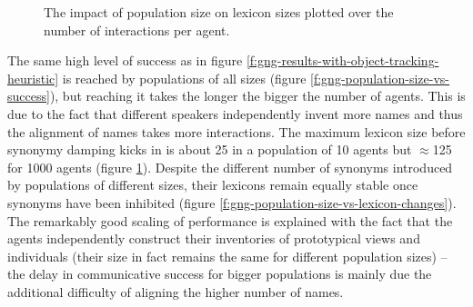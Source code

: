 \begin{figure}[p]
  \caption{The impact of population size on lexicon sizes plotted over
    the number of interactions per agent.}
  \label{f:gng-population-size-vs-lexicon-size}
\end{figure}

The same high level of success as in figure
\ref{f:gng-results-with-object-tracking-heuristic} is reached by
populations of all sizes (figure
\ref{f:gng-population-size-vs-success}), but reaching it takes the
longer the bigger the number of agents. This is due to the fact that
different speakers independently invent more names and thus the
alignment of names takes more interactions. The maximum lexicon size
before synonymy damping kicks in is about 25 in a population of 10
agents but $\approx$125 for 1000 agents (figure
\ref{f:gng-population-size-vs-lexicon-size}). Despite the different
number of synonyms introduced by populations of different sizes, their
lexicons remain equally stable once synonyms have been inhibited
(figure \ref{f:gng-population-size-vs-lexicon-changes}). The
remarkably good scaling of performance is explained with the fact that
the agents independently construct their inventories of prototypical
views and individuals (their size in fact remains the same for
different population sizes) -- the delay in communicative success for
bigger populations is mainly due the additional difficulty of aligning
the higher number of names.




